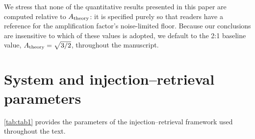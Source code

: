 \documentclass[twocolumn]{aastex631}
\newcommand{\vtwo}[1]{{#1}}
\begin{document}
\vtwo{We stress that none of the quantitative results presented in this paper are computed relative to $A_{\rm theory}$: it is specified purely so that readers have a reference for the amplification factor's noise-limited floor. Because our conclusions are insensitive to which of these values is adopted, we default to the 2:1 baseline value, $A_{\rm theory} = \sqrt{3/2}$, throughout the manuscript.}

\clearpage

\section{System and injection--retrieval parameters}\label{sec:appendix_table}

\autoref{tab:tab1} provides the parameters of the injection--retrieval framework used throughout the text.
\end{document}
